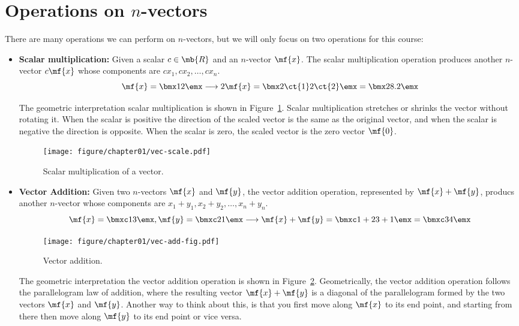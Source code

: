 \section{Operations on $n$-vectors}
There are many operations we can perform on $n$-vectors, but we will only focus on two operations for this course:
\begin{itemize}
    \item \textbf{Scalar multiplication:} Given a scalar $c \in \mb{R}$ and an $n$-vector $\mf{x}$. The scalar multiplication operation produces another $n$-vector $c\mf{x}$ whose components are $cx_1, cx_2, \ldots, cx_n$. 
    \[ \mf{x} = \bmx 1 \\ 2\emx \longrightarrow 2 \mf{x} = \bmx  2\ct{1} \\ 2\ct{2} \emx = \bmx  2 \\ 8.2 \emx \]

    The geometric interpretation scalar multiplication is shown in Figure~\ref{fig:ch01-scalar-mult}. Scalar multiplication stretches or shrinks the vector without rotating it. When the scalar is positive the direction of the scaled vector is the same as the original vector, and when the scalar is negative the direction is opposite. When the scalar is zero, the scaled vector is the zero vector $\mf{0}$. 
    \begin{figure}[h!]
        \centering
        \texttt{[image: figure/chapter01/vec-scale.pdf]}
        \caption{Scalar multiplication of a vector.}
        \label{fig:ch01-scalar-mult}
    \end{figure}
    
    \item \textbf{Vector Addition:} Given two $n$-vectors $\mf{x}$ and $\mf{y}$, the vector addition operation, represented by $\mf{x} + \mf{y}$, producs another $n$-vector whose components are $x_1 + y_1, x_2 + y_2, \ldots, x_n + y_n$.
    \[ \mf{x} = \bmxc 1 \\ 3 \emx, \mf{y} = \bmxc 2 \\ 1 \emx \longrightarrow \mf{x} + \mf{y} = \bmxc 1 + 2 \\ 3 + 1 \emx = \bmxc 3 \\ 4 \emx \]
    
    \begin{figure}[h!]
        \centering
        \texttt{[image: figure/chapter01/vec-add-fig.pdf]}
        \caption{Vector addition.}
        \label{fig:ch01-vec-add}
    \end{figure}

    The geometric interpretation the vector addition operation is shown in Figure~\ref{fig:ch01-vec-add}. Geometrically, the vector addition operation follows the parallelogram law of addition, where the resulting vector $\mf{x} + \mf{y}$ is a diagonal of the parallelogram formed by the two vectors $\mf{x}$ and $\mf{y}$. Another way to think about this, is that you first move along $\mf{x}$ to its end point, and starting from there then move along $\mf{y}$ to its end point or vice versa.


\end{itemize}
